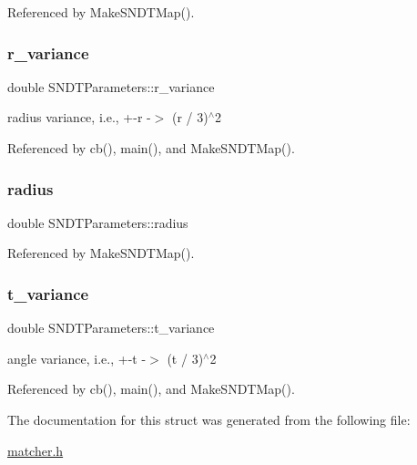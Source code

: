 Referenced by Make\+S\+N\+D\+T\+Map().

\mbox{\label{structSNDTParameters_a3d9f72a08ba03884c82e5143c5fd24eb}} 
\subsubsection{\texorpdfstring{r\+\_\+variance}{r\_variance}}
{\footnotesize\ttfamily double S\+N\+D\+T\+Parameters\+::r\+\_\+variance}

radius variance, i.\+e., +-\/r -\/$>$ (r / 3)$^\wedge$2 

Referenced by cb(), main(), and Make\+S\+N\+D\+T\+Map().

\mbox{\label{structSNDTParameters_a031a9440acf67e6b3d9dad08c8af2562}} 
\subsubsection{\texorpdfstring{radius}{radius}}
{\footnotesize\ttfamily double S\+N\+D\+T\+Parameters\+::radius}



Referenced by Make\+S\+N\+D\+T\+Map().

\mbox{\label{structSNDTParameters_aa138682632a0ad7d1ccf8cfe0b1f5b0b}} 
\subsubsection{\texorpdfstring{t\+\_\+variance}{t\_variance}}
{\footnotesize\ttfamily double S\+N\+D\+T\+Parameters\+::t\+\_\+variance}

angle variance, i.\+e., +-\/t -\/$>$ (t / 3)$^\wedge$2 

Referenced by cb(), main(), and Make\+S\+N\+D\+T\+Map().



The documentation for this struct was generated from the following file\+:\begin{DoxyCompactItemize}
\item 
\hyperlink{matcher_8h}{matcher.\+h}\end{DoxyCompactItemize}
